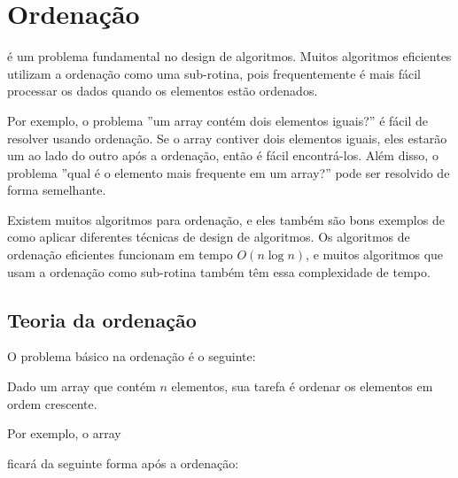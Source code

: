 \chapter{Ordenação}


é um problema fundamental no design de algoritmos.
Muitos algoritmos eficientes
utilizam a ordenação como uma sub-rotina, 
pois frequentemente é mais fácil processar 
os dados quando os elementos estão ordenados.

Por exemplo, o problema ''um array contém 
dois elementos iguais?'' é fácil de resolver usando ordenação. 
Se o array contiver dois elementos iguais, 
eles estarão um ao lado do outro após a ordenação, 
então é fácil encontrá-los. 
Além disso, o problema ''qual é o elemento mais frequente
 em um array?'' pode ser resolvido de forma semelhante.

Existem muitos algoritmos para ordenação, e eles também são
bons exemplos de como aplicar 
diferentes técnicas de design de algoritmos. 
Os algoritmos de ordenação eficientes
funcionam em tempo $O(n \log n)$, 
e muitos algoritmos que usam a ordenação
como sub-rotina também 
têm essa complexidade de tempo.

\section{Teoria da ordenação}

O problema básico na ordenação é o seguinte:
\begin{framed}
\noindent
Dado um array que contém $n$ elementos,
sua tarefa é ordenar os elementos 
em ordem crescente.
\end{framed}
\noindent
Por exemplo, o array
\begin{center}
\end{center}
ficará da seguinte forma após a ordenação:
\begin{center}
\end{center}

